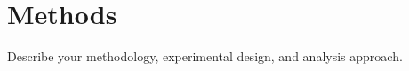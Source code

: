 \section{Methods}
\label{sec:methods}

Describe your methodology, experimental design, and analysis approach.

